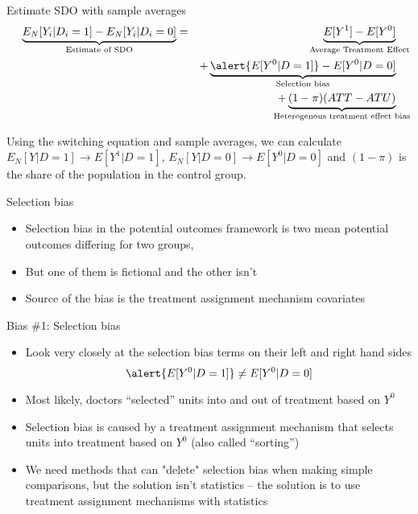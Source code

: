 \documentclass{beamer}
\begin{document}
\begin{frame}[plain]

  \begin{block}{Estimate SDO with sample averages}
    \begin{eqnarray*}
      \underbrace{E_N[Y_i | D_i=1] - E_N[Y_i | D_i=0]}_{ \mathclap{\text{Estimate of SDO}}}&=& \underbrace{E[Y^1] - E[Y^0]}_{ \mathclap{\text{Average Treatment Effect}}} \\
      &&+ \underbrace{\alert{E[Y^0|D=1]} - E[Y^0 | D=0]}_{ \mathclap{\text{Selection bias}}}  \\
      && + \underbrace{(1-\pi)(ATT - ATU)}_{ \mathclap{\text{Heterogenous treatment effect bias}}}
    \end{eqnarray*}
  \end{block}

\bigskip

Using the switching equation and sample averages, we can calculate $E_N[Y|D=1] \to E[Y^1 | D=1]$, $E_N[Y|D=0] \to E[Y^0|D=0]$ and $(1-\pi)$ is the share of the population in the control group.

\end{frame}


\begin{frame}{Selection bias}

\begin{itemize}
\item Selection bias in the potential outcomes framework is  two mean potential outcomes differing for two groups,
\item But one of them is fictional and the other isn't
\item Source of the bias is the treatment assignment mechanism
covariates

\end{itemize}

\end{frame}

\begin{frame}{Bias \#1: Selection bias}

  \begin{itemize}
    \item Look very closely at the selection bias terms on their left and right hand sides $$\alert{E[Y^0|D=1]} \neq E[Y^0 |D=0]$$
    \item Most likely, doctors ``selected'' units into and out of treatment based on $Y^0$
    \item Selection bias is caused by a treatment assignment mechanism that selects units into treatment based on $Y^0$ (also called ``sorting'')
    \item We need methods that can "delete" selection bias when making simple comparisons, but the solution isn't statistics -- the solution is to use treatment assignment mechanisms with statistics
      \end{itemize}

\end{frame}
\end{document}

